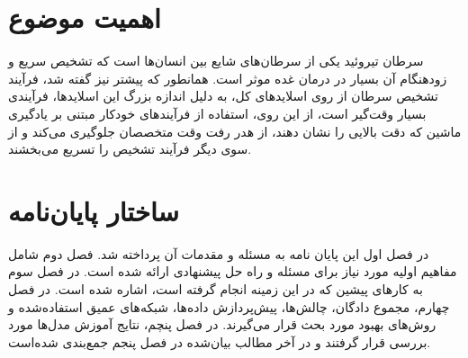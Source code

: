 \section{اهمیت موضوع}\label{sec:اهمیت موضوع}
سرطان تیروئید یکی از سرطان‌های شایع بین انسان‌ها است که تشخیص سریع و زودهنگام آن بسیار در درمان غده موثر است.
همانطور که پیشتر نیز گفته شد، فرآیند تشخیص سرطان از روی اسلاید‌های کل، به دلیل اندازه بزرگ این اسلایدها، فرآیندی بسیار وقت‌گیر است، از این روی، استفاده از فرآیند‌های خودکار مبتنی بر یادگیری ماشین که دقت بالایی را نشان دهند، از هدر رفت وقت متخصصان جلوگیری می‌کند و از سوی دیگر فرآیند تشخیص را تسریع می‌بخشند.


\section{ساختار پایان‌نامه}\label{sec:ساختار پایان‌نامه}
در فصل اول این پایان نامه به مسئله و مقدمات آن پرداخته شد.
فصل دوم شامل مفاهیم اولیه مورد نیاز برای مسئله و راه حل پیشنهادی ارائه شده است.
در فصل سوم به کارهای پیشین که در این زمینه انجام گرفته است، اشاره شده است.
در فصل چهارم، مجموع دادگان، چالش‌ها، پیش‌پردازش داده‌ها، شبکه‌های عمیق استفاده‌شده و روش‌های بهبود مورد بحث قرار می‌گیرند.
در فصل پنچم، نتایج آموزش مدل‌ها مورد بررسی قرار گرفتند و در آخر مطالب بیان‌شده در فصل پنجم جمع‌بندی شده‌است.
 


